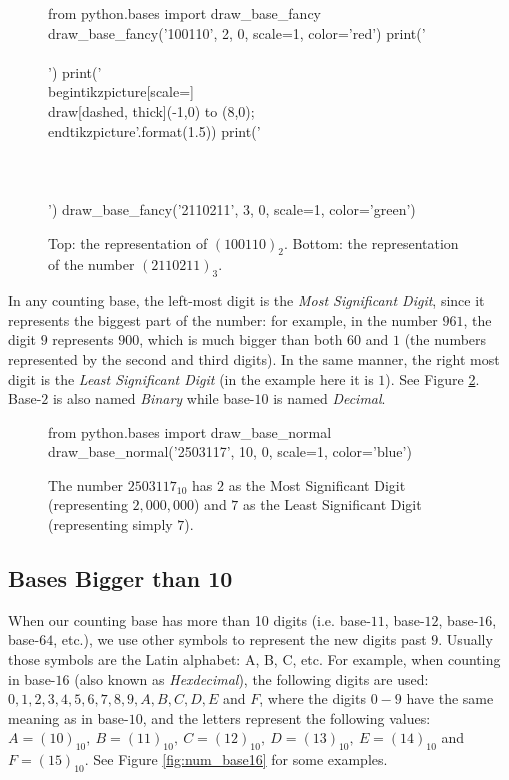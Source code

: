 \begin{figure}
  \centering
  \begin{pycode}
from python.bases import draw_base_fancy
draw_base_fancy('100110', 2, 0, scale=1, color='red')
print('\\\\')
print('\\begin{{tikzpicture}}[scale={}] \\draw[dashed, thick](-1,0) to (8,0); \\end{{tikzpicture}}'.format(1.5))
print('\\\\~\\\\')
draw_base_fancy('2110211', 3, 0, scale=1, color='green')
  \end{pycode}
  \caption[Graphical representation of two numbers in bases 2 and 3]{Top: the representation of $\left( 100110 \right)_{2}$. Bottom: the representation of the number $\left( 2110211 \right)_{3}$.}
  \label{fig:nums_in_bases_2_3}
\end{figure} 

In any counting base, the left-most digit is the \textit{Most Significant Digit}, since it represents the biggest part of the number: for example, in the number $961$, the digit $9$ represents $900$, which is much bigger than both $60$ and $1$ (the numbers represented by the second and third digits). In the same manner, the right most digit is the \textit{Least Significant Digit} (in the example here it is $1$). See Figure \ref{fig:significant_digits}. Base-$2$ is also named \textit{Binary} while base-$10$ is named \textit{Decimal}. \par

\begin{figure}
  \centering
  \begin{pycode}
from python.bases import draw_base_normal
draw_base_normal('2503117', 10, 0, scale=1, color='blue')
  \end{pycode}
  \caption[]{The number $2503117_{10}$ has $2$ as the Most Significant Digit (representing $2,000,000$) and $7$ as the Least Significant Digit (representing simply $7$).}
  \label{fig:significant_digits}
\end{figure} 

\subsection{Bases Bigger than 10}
When our counting base has more than 10 digits (i.e. base-$11$, base-$12$, base-$16$, base-$64$, etc.), we use other symbols to represent the new digits past $9$. Usually those symbols are the Latin alphabet: A, B, C, etc. For example, when counting in base-$16$ (also known as \textit{Hexdecimal}), the following digits are used: $0,1,2,3,4,5,6,7,8,9,A,B,C,D,E$ and $F$, where the digits $0-9$ have the same meaning as in base-$10$, and the letters represent the following values: $A=\left( 10 \right)_{10},\ B=\left( 11 \right)_{10},\ C=\left( 12 \right)_{10},\ D=\left( 13 \right)_{10},\ E=\left( 14 \right)_{10}$ and $F=\left( 15 \right)_{10}$. See Figure \ref{fig:num_base16} for some examples. \par

